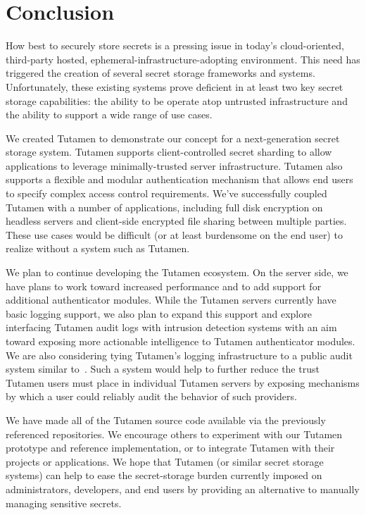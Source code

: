 \section{Conclusion}
\label{sec:conclusion}

How best to securely store secrets is a pressing issue in today's
cloud-oriented, third-party hosted, ephemeral-infrastructure-adopting
environment. This need has triggered the creation of several secret
storage frameworks and systems. Unfortunately, these existing systems
prove deficient in at least two key secret storage capabilities: the
ability to be operate atop untrusted infrastructure and the ability to
support a wide range of use cases.

We created Tutamen to demonstrate our concept for a next-generation
secret storage system. Tutamen supports client-controlled secret
sharding to allow applications to leverage minimally-trusted server
infrastructure. Tutamen also supports a flexible and modular
authentication mechanism that allows end users to specify complex
access control requirements. We've successfully coupled Tutamen with a
number of applications, including full disk encryption on headless
servers and client-side encrypted file sharing between multiple
parties. These use cases would be difficult (or at least burdensome on
the end user) to realize without a system such as Tutamen.

We plan to continue developing the Tutamen ecosystem. On the server
side, we have plans to work toward increased performance and to add
support for additional authenticator modules. While the Tutamen
servers currently have basic logging support, we also plan to expand
this support and explore interfacing Tutamen audit logs with intrusion
detection systems with an aim toward exposing more actionable
intelligence to Tutamen authenticator modules. We are also considering
tying Tutamen's logging infrastructure to a public audit system
similar to~\cite{laurie2013}. Such a system would help to further
reduce the trust Tutamen users must place in individual Tutamen
servers by exposing mechanisms by which a user could reliably audit
the behavior of such providers.

We have made all of the Tutamen source code available via the
previously referenced repositories. We encourage others to experiment
with our Tutamen prototype and reference implementation, or to
integrate Tutamen with their projects or applications. We hope that
Tutamen (or similar secret storage systems) can help to ease the
secret-storage burden currently imposed on administrators, developers,
and end users by providing an alternative to manually managing
sensitive secrets.

